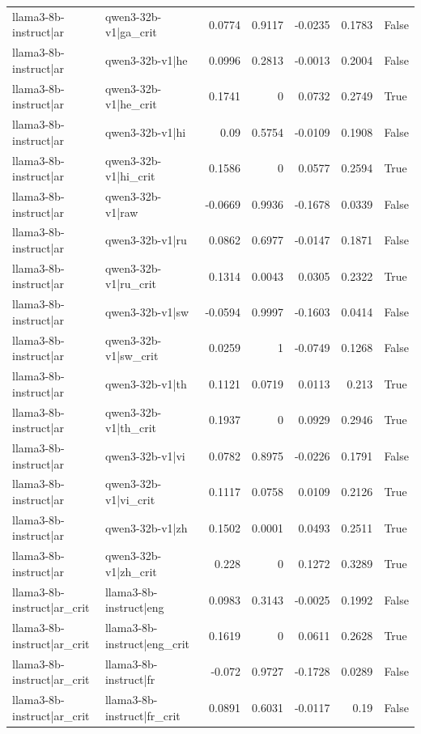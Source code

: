 \begin{table}
\begin{tabular}{l l r r r r l}
llama3-8b-instruct|ar & qwen3-32b-v1|ga_crit & 0.0774 & 0.9117 & -0.0235 & 0.1783 & False \\
llama3-8b-instruct|ar & qwen3-32b-v1|he & 0.0996 & 0.2813 & -0.0013 & 0.2004 & False \\
llama3-8b-instruct|ar & qwen3-32b-v1|he_crit & 0.1741 & 0 & 0.0732 & 0.2749 & True \\
llama3-8b-instruct|ar & qwen3-32b-v1|hi & 0.09 & 0.5754 & -0.0109 & 0.1908 & False \\
llama3-8b-instruct|ar & qwen3-32b-v1|hi_crit & 0.1586 & 0 & 0.0577 & 0.2594 & True \\
llama3-8b-instruct|ar & qwen3-32b-v1|raw & -0.0669 & 0.9936 & -0.1678 & 0.0339 & False \\
llama3-8b-instruct|ar & qwen3-32b-v1|ru & 0.0862 & 0.6977 & -0.0147 & 0.1871 & False \\
llama3-8b-instruct|ar & qwen3-32b-v1|ru_crit & 0.1314 & 0.0043 & 0.0305 & 0.2322 & True \\
llama3-8b-instruct|ar & qwen3-32b-v1|sw & -0.0594 & 0.9997 & -0.1603 & 0.0414 & False \\
llama3-8b-instruct|ar & qwen3-32b-v1|sw_crit & 0.0259 & 1 & -0.0749 & 0.1268 & False \\
llama3-8b-instruct|ar & qwen3-32b-v1|th & 0.1121 & 0.0719 & 0.0113 & 0.213 & True \\
llama3-8b-instruct|ar & qwen3-32b-v1|th_crit & 0.1937 & 0 & 0.0929 & 0.2946 & True \\
llama3-8b-instruct|ar & qwen3-32b-v1|vi & 0.0782 & 0.8975 & -0.0226 & 0.1791 & False \\
llama3-8b-instruct|ar & qwen3-32b-v1|vi_crit & 0.1117 & 0.0758 & 0.0109 & 0.2126 & True \\
llama3-8b-instruct|ar & qwen3-32b-v1|zh & 0.1502 & 0.0001 & 0.0493 & 0.2511 & True \\
llama3-8b-instruct|ar & qwen3-32b-v1|zh_crit & 0.228 & 0 & 0.1272 & 0.3289 & True \\
llama3-8b-instruct|ar_crit & llama3-8b-instruct|eng & 0.0983 & 0.3143 & -0.0025 & 0.1992 & False \\
llama3-8b-instruct|ar_crit & llama3-8b-instruct|eng_crit & 0.1619 & 0 & 0.0611 & 0.2628 & True \\
llama3-8b-instruct|ar_crit & llama3-8b-instruct|fr & -0.072 & 0.9727 & -0.1728 & 0.0289 & False \\
llama3-8b-instruct|ar_crit & llama3-8b-instruct|fr_crit & 0.0891 & 0.6031 & -0.0117 & 0.19 & False \\

\end{tabular}
\end{table}
